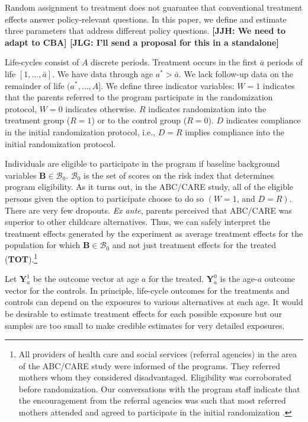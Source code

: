 Random assignment to treatment does not guarantee that conventional treatment effects answer policy-relevant questions. In this paper, we define and estimate three parameters that address different policy questions. \textbf{[JJH: We need to adapt to CBA] [JLG: I'll send a proposal for this in a standalone]}

Life-cycles consist of $A$ discrete periods. Treatment occurs in the first $\bar{a}$ periods of life $\left[1,\dots,\bar{a}\right]$. We have data through age $a^{*}>\bar{a}$. We lack follow-up data on the remainder of life $(a^*,\dots,A]$. We define three indicator variables: $W = 1$ indicates that the parents referred to the program participate in the randomization protocol, $W = 0$ indicates otherwise. $R$ indicates randomization into the treatment group ($R = 1$) or to the control group ($R = 0$). $D$ indicates compliance in the initial randomization protocol, i.e., $D = R$ implies compliance into the initial randomization protocol.

Individuals are eligible to participate in the program if baseline background variables $\bm{B}\in\mathcal{B}_0$. $\mathcal{B}_0$ is the set of scores on the risk index that determines program eligibility. As it turns out, in the ABC/CARE study, all of the eligible persons given the option to participate choose to do so $(W=1\text{, and } D=R)$. There are very few dropouts. \emph{Ex ante}, parents perceived that ABC/CARE was superior to other childcare alternatives. Thus, we can safely interpret the treatment effects generated by the experiment as average treatment effects for the population for which $\bm{B}\in\mathcal{B}_0$ and not just treatment effects for the treated (\textbf{TOT}).\footnote{All providers of health care and social services (referral agencies) in the area of the ABC/CARE study were informed of the programs. They referred mothers whom they considered disadvantaged. Eligibility was corroborated before randomization. Our conversations with the program staff indicate that the encouragement from the referral agencies was such that most referred mothers attended and agreed to participate in the initial randomization \citep{Ramey-etal_2012-ABC}.}

Let $\bm{Y}^1_a$ be the outcome vector at age $a$ for the treated. $\bm{Y}^0_a$ is the age-$a$ outcome vector for the controls. In principle, life-cycle outcomes for the treatments and controls can depend on the exposures to various alternatives at each age. It would be desirable to estimate treatment effects for each possible exposure but our samples are too small to make credible estimates for very detailed exposures.

